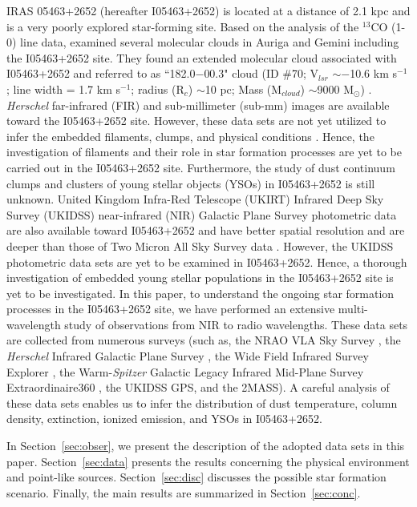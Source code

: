 \documentclass[iop]{emulateapj}
\begin{document}
IRAS 05463+2652 (hereafter I05463+2652) is located at a distance of 2.1 kpc \citep{kawamura98} and is a very poorly explored star-forming site. 
Based on the analysis of the $^{13}$CO (1-0) line data, \citet{kawamura98} examined several molecular clouds in 
Auriga and Gemini including the I05463+2652 site. 
They found an extended molecular cloud associated with I05463+2652 and referred to as ``182.0$-$00.3" cloud (ID \#70; V$_{lsr}$ $\sim$$-$10.6 km s$^{-1}$; line width = 1.7 km s$^{-1}$; radius (R$_{c}$) $\sim$10 pc; Mass (M$_{cloud}$) $\sim$9000 M$_{\odot}$) \citep[see Table 1 and Figure 9j in][]{kawamura98}. 
{\it Herschel} far-infrared (FIR) and sub-millimeter (sub-mm) images are available toward the I05463+2652 site. 
However, these data sets are not yet utilized to infer the embedded filaments, clumps, and physical conditions \citep[e.g.,][]{schneider12,dewangan15,dewangan17a}. 
Hence, the investigation of filaments and their role in star formation processes are yet to be carried out in the I05463+2652 site. 
Furthermore, the study of dust continuum clumps and clusters of young stellar objects (YSOs) in I05463+2652 is still unknown. 
United Kingdom Infra-Red Telescope (UKIRT) Infrared Deep Sky Survey (UKIDSS) near-infrared (NIR) Galactic 
Plane Survey \citep[GPS;][]{lawrence07} photometric data are also available toward I05463+2652 and have better spatial resolution and are deeper than those of Two Micron All Sky Survey data \citep[2MASS;][]{skrutskie06}. 
However, the UKIDSS photometric data sets are yet to be examined in I05463+2652. Hence, a thorough investigation of embedded young stellar populations in the I05463+2652 site is yet to be investigated. 
In this paper, to understand the ongoing star formation processes in the I05463+2652 site, we have performed an 
extensive multi-wavelength study of observations from NIR to radio wavelengths. 
These data sets are collected from numerous surveys 
(such as, the NRAO VLA Sky Survey \citep[NVSS;][]{condon98}, 
the {\it Herschel} Infrared Galactic Plane Survey \citep[Hi-GAL;][]{molinari10}, 
the Wide Field Infrared Survey Explorer \citep[WISE;][]{wright10}, 
the Warm-{\it Spitzer} Galactic Legacy Infrared Mid-Plane Survey Extraordinaire360 \citep[Glimpse360;][]{whitney11}, 
the UKIDSS GPS, and the 2MASS). 
A careful analysis of these data sets enables us to infer the distribution of dust temperature, column density, extinction, ionized emission, 
and YSOs in I05463+2652. 

In Section~\ref{sec:obser}, we present the description of the adopted data sets in this paper. 
Section~\ref{sec:data} presents the results concerning the physical environment and point-like sources.  
Section~\ref{sec:disc} discusses the possible star formation scenario. 
Finally, the main results are summarized in Section~\ref{sec:conc}.
%
\end{document}
